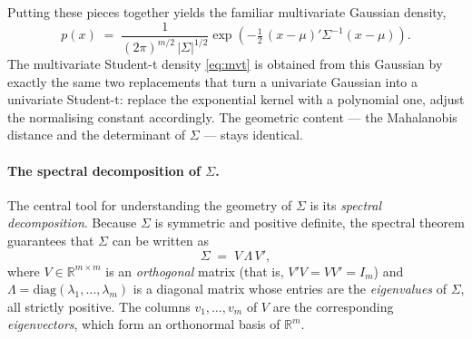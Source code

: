 \documentclass[11pt, a4paper, oneside]{article}
\begin{document}
Putting these pieces together yields the familiar multivariate Gaussian
density,
\[
p(x) \;=\; \frac{1}{(2\pi)^{m/2}\,|\Sigma|^{1/2}}
\exp\!\left(-\tfrac{1}{2}\,(x-\mu)'\Sigma^{-1}(x-\mu)\right).
\]
The multivariate Student-t density \eqref{eq:mvt} is obtained from this
Gaussian by exactly the same two replacements that turn a univariate
Gaussian into a univariate Student-t: replace the exponential kernel
with a polynomial one, adjust the normalising constant accordingly. The
geometric content — the Mahalanobis distance and the determinant of
$\Sigma$ — stays identical.

\paragraph{The spectral decomposition of $\Sigma$.}
The central tool for understanding the geometry of $\Sigma$ is its
\emph{spectral decomposition}. Because $\Sigma$ is symmetric and
positive definite, the spectral theorem guarantees that $\Sigma$ can be
written as
\begin{equation}
\Sigma \;=\; V\, \Lambda\, V',
\label{eq:spectral}
\end{equation}
where $V \in \mathbb{R}^{m \times m}$ is an \emph{orthogonal} matrix
(that is, $V' V = V V' = I_m$) and
$\Lambda = \mathrm{diag}(\lambda_1, \ldots, \lambda_m)$ is a diagonal
matrix whose entries are the \emph{eigenvalues} of $\Sigma$, all strictly
positive. The columns $v_1, \ldots, v_m$ of $V$ are the corresponding
\emph{eigenvectors}, which form an orthonormal basis of $\mathbb{R}^m$.
\end{document}
